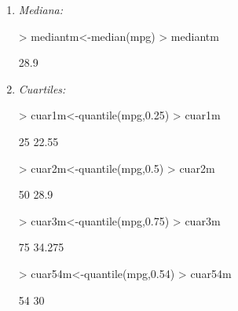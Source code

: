 \documentclass [a4paper] {article}
\begin{document}
\begin{enumerate}
\item
\textit{Mediana:}
\begin{Schunk}
\begin{Sinput}
> mediantm<-median(mpg)
> mediantm
\end{Sinput}
\begin{Soutput}
[1] 28.9
\end{Soutput}
\end{Schunk}

\item
\textit{Cuartiles:}
\begin{Schunk}
\begin{Sinput}
> cuar1m<-quantile(mpg,0.25)
> cuar1m
\end{Sinput}
\begin{Soutput}
  25% 
22.55 
\end{Soutput}
\begin{Sinput}
> cuar2m<-quantile(mpg,0.5)
> cuar2m
\end{Sinput}
\begin{Soutput}
 50% 
28.9 
\end{Soutput}
\begin{Sinput}
> cuar3m<-quantile(mpg,0.75)
> cuar3m
\end{Sinput}
\begin{Soutput}
   75% 
34.275 
\end{Soutput}
\begin{Sinput}
> cuar54m<-quantile(mpg,0.54)
> cuar54m
\end{Sinput}
\begin{Soutput}
54% 
 30 
\end{Soutput}
\end{Schunk}
\end{enumerate}
\end{document}
